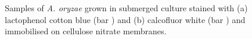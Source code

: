 \begin{figure}[htbp]
	\centering
	\hspace{0.5cm}
	\caption{Samples of \emph{A. oryzae} grown in submerged culture stained with (a) lactophenol cotton blue (bar ) and (b) calcofluor white (bar ) and immobilised on cellulose nitrate membranes.}
	\label{fig:Submerged}
\end{figure}

